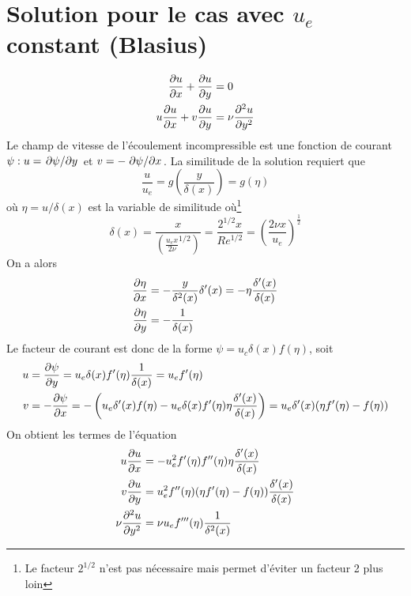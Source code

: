   \section{Solution pour le cas avec $u_e$ constant (Blasius)}
    \begin{equation}
      \begin{aligned}
        \pdv{u}{x} + \pdv{u}{y} &= 0\\
        u\pdv{u}{x} + v \pdv{u}{y} &= \nu \pdv[2]{u}{y}
      \end{aligned}
    \end{equation}
    Le champ de vitesse de l'écoulement incompressible est une fonction de courant $\psi : u = \pdv*{\psi}{y}$ et $v = - \pdv*{\psi}{x}$. La similitude de la solution requiert que
    \begin{equation}
      \frac{u}{u_e} = g\left(\frac{y}{\delta(x)}\right) = g(\eta)
    \end{equation}
    où $\eta = u/\delta(x)$ est la variable de similitude où\footnote{Le facteur $2^{1/2}$ n'est pas nécessaire mais permet d'éviter un facteur 2 plus loin}
    \begin{equation}
      \delta(x) = \frac{x}{\left(\frac{u_e x}{2\nu}^{1/2}\right)} = \frac{2^{1/2}x}{Re^{1/2}} = \left(\frac{2\nu x}{u_e}\right)^{\frac{1}{2}}
    \end{equation}
    On a alors
    \begin{equation}
      \begin{aligned}
        \pdv{\eta}{x} &= -\frac{y}{\delta^2(x)} \delta'(x) = -\eta \frac{\delta'(x)}{\delta(x)}\\
        \pdv{\eta}{y} &= -\frac{1}{\delta(x)}
      \end{aligned}
    \end{equation}
    Le facteur de courant est donc de la forme $\psi=u_c\delta(x)f(\eta)$, soit
    \begin{equation}
      \begin{aligned}
        u &= \pdv{\psi}{y} = u_e \delta(x) f'(\eta) \frac{1}{\delta(x)} = u_e f'(\eta)\\
        v &= -\pdv{\psi}{x} = -\left(u_e\delta'(x)f(\eta) - u_e \delta(x) f'(\eta)\eta\frac{\delta'(x)}{\delta(x)}\right)
        = u_e \delta'(x) (\eta f'(\eta) - f(\eta))
      \end{aligned}
    \end{equation}
    On obtient les termes de l'équation
    \begin{equation}
      \begin{aligned}
        u\pdv{u}{x} &= -u_e^2 f'(\eta) f''(\eta) \eta\frac{\delta'(x)}{\delta(x)}\\
        v\pdv{u}{y} &= u_e^2 f''(\eta)(\eta f'(\eta) - f(\eta))\frac{\delta'(x)}{\delta(x)}\\
        \nu\pdv[2]{u}{y} &= \nu u_e f'''(\eta) \frac{1}{\delta^2(x)}
      \end{aligned}
    \end{equation}

